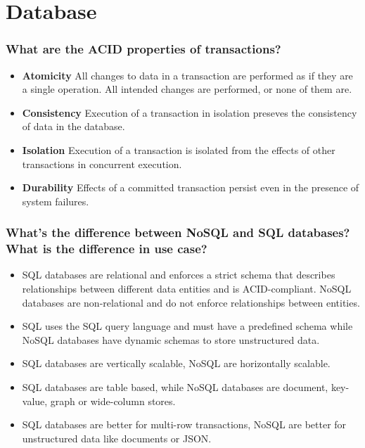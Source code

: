 \documentclass[12pt, a4paper]{article}
\begin{document}
\pagebreak

\section*{Database}
\subsubsection*{What are the ACID properties of transactions?}
\begin{itemize}
  \item \textbf{Atomicity} All changes to data in a transaction are performed as if they are a single operation.
        All intended changes are performed, or none of them are.
  \item \textbf{Consistency} Execution of a transaction in isolation preseves the consistency of data in the database.
  \item \textbf{Isolation} Execution of a transaction is isolated from the effects of other transactions in concurrent execution.
  \item \textbf{Durability} Effects of a committed transaction persist even in the presence of system failures.
\end{itemize}

\subsubsection*{What's the difference between NoSQL and SQL databases? What is the difference in use case?}
\begin{itemize}
  \item SQL databases are relational and enforces a strict schema that describes relationships between different data entities and is ACID-compliant.
        NoSQL databases are non-relational and do not enforce relationships between entities.
  \item SQL uses the SQL query language and must have a predefined schema while NoSQL databases have dynamic schemas to store unstructured data.
  \item SQL databases are vertically scalable, NoSQL are horizontally scalable.
  \item SQL databases are table based, while NoSQL databases are document, key-value, graph or wide-column stores.
  \item SQL databases are better for multi-row transactions, NoSQL are better for unstructured data like documents or JSON.
\end{itemize}
\end{document}
